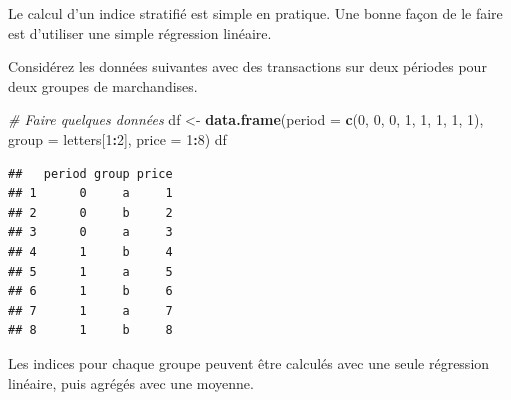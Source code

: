 \documentclass[]{article}
\newenvironment{Shaded}{\begin{snugshade}}{\end{snugshade}}
\newcommand{\CommentTok}[1]{\textcolor[rgb]{0.56,0.35,0.01}{\textit{#1}}}
\newcommand{\DataTypeTok}[1]{\textcolor[rgb]{0.13,0.29,0.53}{#1}}
\newcommand{\DecValTok}[1]{\textcolor[rgb]{0.00,0.00,0.81}{#1}}
\newcommand{\KeywordTok}[1]{\textcolor[rgb]{0.13,0.29,0.53}{\textbf{#1}}}
\newcommand{\NormalTok}[1]{#1}
\newcommand{\OperatorTok}[1]{\textcolor[rgb]{0.81,0.36,0.00}{\textbf{#1}}}
\newcommand{\StringTok}[1]{\textcolor[rgb]{0.31,0.60,0.02}{#1}}
\begin{document}
Le calcul d'un indice stratifié est simple en pratique. Une bonne façon de le faire est d'utiliser une simple régression linéaire.

Considérez les données suivantes avec des transactions sur deux périodes pour deux groupes de marchandises.

\begin{Shaded}
\begin{Highlighting}[]
\CommentTok{# Faire quelques données}
\NormalTok{df <-}\StringTok{ }\KeywordTok{data.frame}\NormalTok{(}\DataTypeTok{period =} \KeywordTok{c}\NormalTok{(}\DecValTok{0}\NormalTok{, }\DecValTok{0}\NormalTok{, }\DecValTok{0}\NormalTok{, }\DecValTok{1}\NormalTok{, }\DecValTok{1}\NormalTok{, }\DecValTok{1}\NormalTok{, }\DecValTok{1}\NormalTok{, }\DecValTok{1}\NormalTok{), }
                 \DataTypeTok{group =}\NormalTok{ letters[}\DecValTok{1}\OperatorTok{:}\DecValTok{2}\NormalTok{],}
                 \DataTypeTok{price =} \DecValTok{1}\OperatorTok{:}\DecValTok{8}\NormalTok{)}
\NormalTok{df}
\end{Highlighting}
\end{Shaded}

\begin{verbatim}
##   period group price
## 1      0     a     1
## 2      0     b     2
## 3      0     a     3
## 4      1     b     4
## 5      1     a     5
## 6      1     b     6
## 7      1     a     7
## 8      1     b     8
\end{verbatim}

Les indices pour chaque groupe peuvent être calculés avec une seule régression linéaire, puis agrégés avec une moyenne.

\begin{Shaded}
\end{Shaded}
\end{document}
